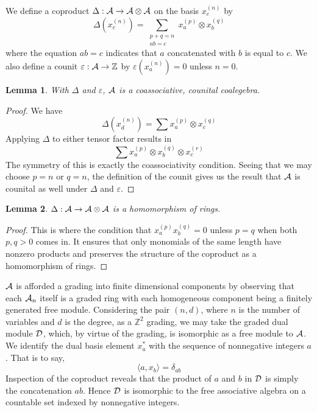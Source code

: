 \documentclass{amsart}
\newtheorem{lemma}{Lemma}[subsection]
\newtheorem{corollary}[lemma]{Corollary}
\theoremstyle{definition}
\theoremstyle{remark}
\numberwithin{equation}{subsection}
\begin{document}
We define a coproduct $\Delta:\mathcal{A}\to\mathcal{A}\otimes\mathcal{A}$ on the basis $x_c^{(n)}$ by
$$\Delta(x_c^{(n)}) = \sum_{\substack{p+q=n\\ab=c}} x_a^{(p)}\otimes x_b^{(q)}$$
where the equation $ab=c$ indicates that $a$ concatenated with $b$ is equal to $c$. We also define a counit $\varepsilon:\mathcal{A}\to \mathbb{Z}$ by $\varepsilon(x_a^{(n)})=0$ unless $n=0$.

\begin{lemma}
	With $\Delta$ and $\varepsilon$, $\mathcal{A}$ is a coassociative, counital coalegebra.
\end{lemma}
\begin{proof}
	We have 
	$$\Delta(x_d^{(n)})=\sum x_a^{(p)}\otimes x_c^{(q)}$$
	Applying $\Delta$ to either tensor factor results in
	$$\sum x_a^{(p)}\otimes x_b^{(q)}\otimes x_c^{(r)}$$
	The symmetry of this is exactly the coassociativity condition. Seeing that we may choose $p=n$ or $q=n$, the definition of the counit gives us the result that $\mathcal{A}$ is counital as well under $\Delta$ and $\varepsilon$.
\end{proof}

\begin{lemma}
	$\Delta:\mathcal{A}\to\mathcal{A}\otimes\mathcal{A}$ is a homomorphism of rings.
\end{lemma}
\begin{proof}
	This is where the condition that $x_a^{(p)}x_b^{(q)}=0$ unless $p=q$ when both $p,q>0$ comes in. It ensures that only monomials of the same length have nonzero products and preserves the structure of the coproduct as a homomorphism of rings.
\end{proof}

	


$\mathcal{A}$ is afforded a grading into finite dimensional components by observing that each $\mathcal{A}_n$ itself is a graded ring with each homogeneous component being a finitely generated free module. Considering the pair $(n, d)$, where $n$ is the number of variables and $d$ is the degree, as a $\mathbb{Z}^2$ grading, we may take the graded dual module $\mathcal{D}$, which, by virtue of the grading, is isomorphic as a free module to $\mathcal{A}$. We identify the dual basis element $x_a^*$ with the sequence of nonnegative integers $a$. That is to say,
$$\langle a, x_b\rangle = \delta_{ab}$$
Inspection of the coproduct reveals that the product of $a$ and $b$ in $\mathcal{D}$ is simply the concatenation $ab$. Hence $\mathcal{D}$ is isomorphic to the free associative algebra on a countable set indexed by nonnegative integers.
\end{document}

